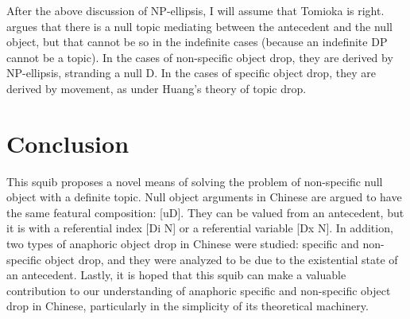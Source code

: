 \documentclass[output=paper]{LSP/langsci}
\begin{document}
After the above discussion of NP-ellipsis, I will assume that Tomioka is right. \citet{Huang1984} argues that there is a null topic mediating between the antecedent and the null object, but that cannot be so in the indefinite cases (because an indefinite DP cannot be a topic). In the cases of non-specific object drop, they are derived by NP-ellipsis, stranding a null D. In the cases of specific object drop, they are derived by movement, as under Huang’s theory of topic drop.


\section{Conclusion}


This squib proposes a novel means of solving the problem of non-specific null object with a definite topic. Null object arguments in Chinese are argued to have the same featural composition: [uD]. They can be valued from an antecedent, but it is with a referential index [Di N] or a referential variable [Dx N]. In addition, two types of anaphoric object drop in Chinese were studied: specific and non-specific object drop, and they were analyzed to be due to the existential state of an antecedent. Lastly, it is hoped that this squib can make a valuable contribution to our understanding of anaphoric specific and non-specific object drop in Chinese, particularly in the simplicity of its theoretical machinery.

 
\printbibliography[heading=subbibliography,notkeyword=this]
\end{document}
